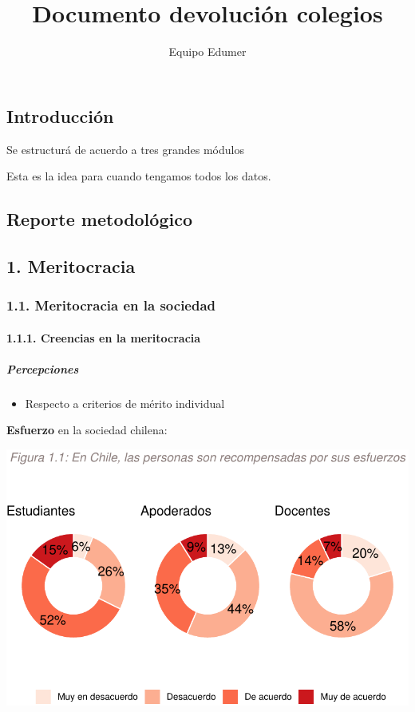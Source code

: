 \documentclass[
  letterpaper,
  DIV=11,
  numbers=noendperiod]{scrartcl}
\title{Documento devolución colegios}
\author{Equipo Edumer}
\date{}
\let\oldparagraph\paragraph
\renewcommand{\paragraph}[1]{\oldparagraph{#1}\mbox{}}
\let\oldsubparagraph\subparagraph
\renewcommand{\subparagraph}[1]{\oldsubparagraph{#1}\mbox{}}
\providecommand{\tightlist}{%
  \setlength{\itemsep}{0pt}\setlength{\parskip}{0pt}}\usepackage{longtable,booktabs,array}
\begin{document}
\maketitle

\subsection{Introducción}\label{introducciuxf3n}

Se estructurá de acuerdo a tres grandes módulos

Esta es la idea para cuando tengamos todos los datos.

\subsection{Reporte metodológico}\label{reporte-metodoluxf3gico}

\subsection{1. Meritocracia}\label{meritocracia}

\subsubsection{1.1. Meritocracia en la
sociedad}\label{meritocracia-en-la-sociedad}

\paragraph{1.1.1. Creencias en la
meritocracia}\label{creencias-en-la-meritocracia}

\subparagraph{Percepciones}\label{percepciones}

\begin{itemize}
\tightlist
\item
  Respecto a criterios de mérito individual
\end{itemize}

\textbf{Esfuerzo} en la sociedad chilena:

\includegraphics{doc-colegios-con-profes-y-apoderados_files/figure-pdf/unnamed-chunk-6-1.pdf}
\end{document}

